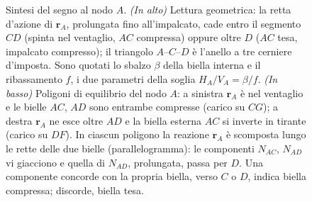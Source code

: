 \begin{figure}[htbp]
{}%
	\caption{Sintesi del segno al nodo $A$. \emph{(In alto)} Lettura geometrica:
		la retta d'azione di $\mathbf r_A$, prolungata fino all'impalcato, cade
		entro il segmento $CD$ (spinta nel ventaglio, $AC$ compressa) oppure
		oltre $D$ ($AC$ tesa, impalcato compresso); il triangolo $A$--$C$--$D$ è
		l'anello a tre cerniere d'imposta. Sono quotati lo sbalzo $\beta$ della
		biella interna e il ribassamento $f$, i due parametri della soglia
		$H_A/V_A=\beta/f$. \emph{(In basso)} Poligoni di equilibrio del nodo $A$:
		a sinistra $\mathbf r_A$ è nel ventaglio e le bielle $AC$, $AD$ sono
		entrambe compresse (carico su $CG$); a destra $\mathbf r_A$ ne esce oltre
		$AD$ e la biella esterna $AC$ si inverte in tirante (carico su $DF$). In ciascun poligono la reazione $\mathbf r_A$ è scomposta lungo le rette
		delle due bielle (parallelogramma): le componenti $N_{AC}$, $N_{AD}$ vi
		giacciono e quella di $N_{AD}$, prolungata, passa per $D$. Una componente	concorde con la propria biella, verso $C$ o $D$, indica biella compressa;	discorde, biella tesa.}
	\label{fig:stampella_ventaglio}
	\end{figure}
